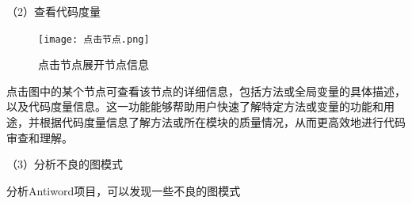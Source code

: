 \noindent（2）查看代码度量

\begin{figure}[h]
\centering
\texttt{[image: 点击节点.png]}
\caption{点击节点展开节点信息}
\end{figure}

 点击图中的某个节点可查看该节点的详细信息，包括方法或全局变量的具体描述，以及代码度量信息。这一功能能够帮助用户快速了解特定方法或变量的功能和用途，并根据代码度量信息了解方法或所在模块的质量情况，从而更高效地进行代码审查和理解。

\noindent（3）分析不良的图模式

分析Antiword项目，可以发现一些不良的图模式


\begin{figure}[!h]
    \setlength{\subfigcapskip}{-1bp}
    \centering
    \begin{minipage}{\textwidth}
    \centering
    \hspace{2em}
    \end{minipage}
    \centering
    \begin{minipage}{\textwidth}
    \centering

\end{minipage}
\end{figure}
